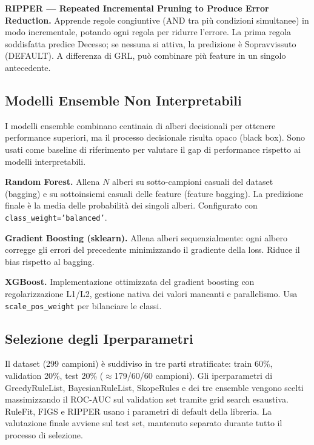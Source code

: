 \documentclass[a4paper,11pt]{article}
\begin{document}
\textbf{RIPPER --- Repeated Incremental Pruning to Produce Error Reduction.}
Apprende regole congiuntive (AND tra più condizioni simultanee) in modo incrementale, potando
ogni regola per ridurre l'errore. La prima regola soddisfatta predice Decesso; se nessuna si
attiva, la predizione è Sopravvissuto (DEFAULT). A differenza di GRL, può combinare più
feature in un singolo antecedente.

\subsection{Modelli Ensemble Non Interpretabili}

I modelli ensemble combinano centinaia di alberi decisionali per ottenere performance
superiori, ma il processo decisionale risulta opaco (black box). Sono usati come baseline
di riferimento per valutare il gap di performance rispetto ai modelli interpretabili.

\textbf{Random Forest.}
Allena $N$ alberi su sotto-campioni casuali del dataset (bagging) e su sottoinsiemi casuali
delle feature (feature bagging). La predizione finale è la media delle probabilità dei
singoli alberi. Configurato con \texttt{class\_weight='balanced'}.

\textbf{Gradient Boosting (sklearn).}
Allena alberi sequenzialmente: ogni albero corregge gli errori del precedente minimizzando
il gradiente della loss. Riduce il bias rispetto al bagging.

\textbf{XGBoost.}
Implementazione ottimizzata del gradient boosting con regolarizzazione L1/L2, gestione
nativa dei valori mancanti e parallelismo. Usa \texttt{scale\_pos\_weight} per bilanciare
le classi.

\subsection{Selezione degli Iperparametri}

Il dataset (299 campioni) è suddiviso in tre parti stratificate: train 60\%, validation 20\%,
test 20\% ($\approx$179/60/60 campioni). Gli iperparametri di GreedyRuleList, BayesianRuleList,
SkopeRules e dei tre ensemble vengono scelti massimizzando il ROC-AUC sul validation set
tramite grid search esaustiva. RuleFit, FIGS e RIPPER usano i parametri di default della
libreria. La valutazione finale avviene sul test set, mantenuto separato durante tutto il
processo di selezione.
\end{document}
